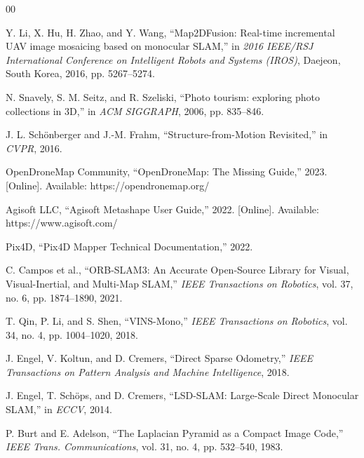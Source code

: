 \documentclass[conference]{IEEEtran}
\begin{document}
\begin{thebibliography}{00}

Y. Li, X. Hu, H. Zhao, and Y. Wang, ``Map2DFusion: Real-time incremental UAV image mosaicing based on monocular SLAM,'' in \textit{2016 IEEE/RSJ International Conference on Intelligent Robots and Systems (IROS)}, Daejeon, South Korea, 2016, pp. 5267--5274.

N. Snavely, S. M. Seitz, and R. Szeliski, ``Photo tourism: exploring photo collections in 3D,'' in \textit{ACM SIGGRAPH}, 2006, pp. 835--846.

J. L. Schönberger and J.-M. Frahm, ``Structure-from-Motion Revisited,'' in \textit{CVPR}, 2016.

OpenDroneMap Community, ``OpenDroneMap: The Missing Guide,'' 2023. [Online]. Available: https://opendronemap.org/

Agisoft LLC, ``Agisoft Metashape User Guide,'' 2022. [Online]. Available: https://www.agisoft.com/

Pix4D, ``Pix4D Mapper Technical Documentation,'' 2022.

C. Campos et al., ``ORB-SLAM3: An Accurate Open-Source Library for Visual, Visual-Inertial, and Multi-Map SLAM,'' \textit{IEEE Transactions on Robotics}, vol. 37, no. 6, pp. 1874--1890, 2021.

T. Qin, P. Li, and S. Shen, ``VINS-Mono,'' \textit{IEEE Transactions on Robotics}, vol. 34, no. 4, pp. 1004--1020, 2018.

J. Engel, V. Koltun, and D. Cremers, ``Direct Sparse Odometry,'' \textit{IEEE Transactions on Pattern Analysis and Machine Intelligence}, 2018.

J. Engel, T. Schöps, and D. Cremers, ``LSD-SLAM: Large-Scale Direct Monocular SLAM,'' in \textit{ECCV}, 2014.

P. Burt and E. Adelson, ``The Laplacian Pyramid as a Compact Image Code,'' \textit{IEEE Trans. Communications}, vol. 31, no. 4, pp. 532--540, 1983.


\end{thebibliography}
\end{document}
